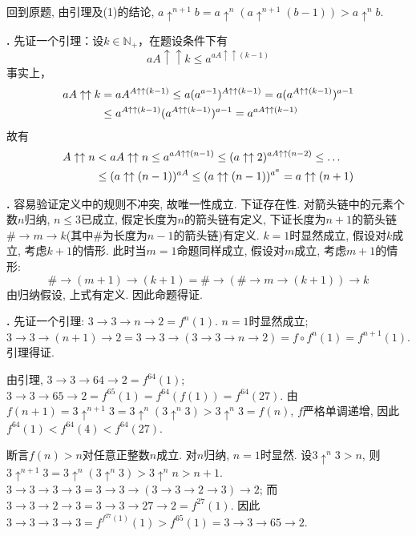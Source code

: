 \par 回到原题, 由引理及(1)的结论, $a\uparrow^{n+1} b = a\uparrow^n (a\uparrow^{n+1} (b-1)) > a\uparrow^n b$. 

\par \textbf{\thesolset .} \cite{RBN} 先证一个引理：设$k \in \mathbb{N}_+$，在题设条件下有
\begin{equation}
    a A\uparrow \uparrow k \le a^{a A\uparrow \uparrow (k-1)}
\end{equation}
事实上，
\begin{align}
    a A\uparrow \uparrow k &= a A^{A\uparrow \uparrow (k-1)} \le a (a^{a-1})^{A\uparrow \uparrow (k-1)}\notag = a (a^{A\uparrow \uparrow (k-1)})^{a-1}\notag \\
    & \le a^{A\uparrow \uparrow (k-1)} (a^{A\uparrow \uparrow (k-1)})^{a-1}=a^{a A\uparrow \uparrow (k-1)}
\end{align}
故有
\begin{align}
    A\uparrow \uparrow n &< a A\uparrow \uparrow n \le a^{aA\uparrow \uparrow (n-1)}\le (a\uparrow \uparrow 2) ^{aA\uparrow \uparrow (n-2)}\le \dots \notag \\
    &\le (a\uparrow \uparrow (n-1)) ^{aA} \le (a\uparrow \uparrow (n-1)) ^{a^a} = a\uparrow \uparrow (n+1)
\end{align}

\par \textbf{\thesolset .} 容易验证定义中的规则不冲突, 故唯一性成立. 下证存在性. 对箭头链中的元素个数$n$归纳, $n\le 3$已成立, 假定长度为$n$的箭头链有定义, 下证长度为$n+1$的箭头链$\#\rightarrow m\rightarrow k$(其中$\#$为长度为$n-1$的箭头链)有定义. $k=1$时显然成立, 假设对$k$成立, 考虑$k+1$的情形. 此时当$m=1$命题同样成立, 假设对$m$成立, 考虑$m+1$的情形:
\begin{equation}
    \#\rightarrow (m+1) \rightarrow (k+1)=\#\rightarrow(\#\rightarrow m \rightarrow (k+1))\rightarrow k
\end{equation}
由归纳假设, 上式有定义. 因此命题得证. 

\par \textbf{\thesolset .} 先证一个引理: $3\rightarrow 3 \rightarrow n \rightarrow 2=f^n(1)$. $n=1$时显然成立; $3\rightarrow 3 \rightarrow (n+1) \rightarrow 2 = 3\rightarrow 3 \rightarrow (3\rightarrow 3 \rightarrow n \rightarrow 2) = f\circ f^n(1)=f^{n+1}(1)$. 引理得证. 
\par 由引理, $3\rightarrow 3 \rightarrow 64 \rightarrow 2=f^{64}(1)$; $3\rightarrow 3 \rightarrow 65 \rightarrow 2=f^{65}(1)=f^{64}(f(1))=f^{64}(27)$. 由$f(n+1)=3\uparrow^{n+1} 3 = 3\uparrow^n (3\uparrow^n 3)>3\uparrow^n 3=f(n)$, $f$严格单调递增, 因此$f^{64}(1)<f^{64}(4)<f^{64}(27)$. 
\par 断言$f(n)>n$对任意正整数$n$成立. 对$n$归纳, $n=1$时显然. 设$3\uparrow^n 3>n$, 则$3\uparrow^{n+1} 3=3\uparrow^n (3\uparrow^n 3)>3\uparrow^n n>n+1$. $3\rightarrow 3 \rightarrow 3 \rightarrow 3=3\rightarrow 3 \rightarrow (3\rightarrow 3 \rightarrow 2 \rightarrow 3) \rightarrow 2$; 而$3\rightarrow 3 \rightarrow 2 \rightarrow 3= 3\rightarrow 3 \rightarrow 27 \rightarrow 2 = f^{27}(1)$. 因此$3\rightarrow 3 \rightarrow 3 \rightarrow 3=f^{f^{27}(1)}(1)>f^{65}(1)=3\rightarrow 3 \rightarrow 65 \rightarrow 2$.

